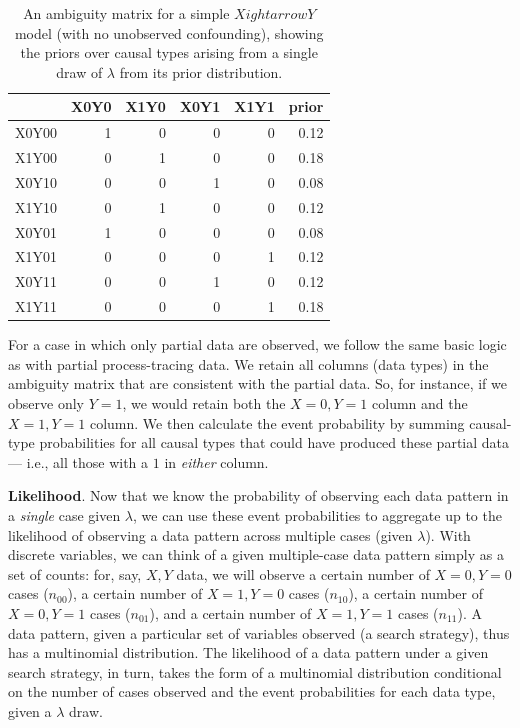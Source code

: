 \documentclass[12pt,]{book}
\begin{document}
\begin{table}[t]

\caption{\label{tab:ambigmatrixmix}An ambiguity matrix for a simple $X 
ightarrow Y$ model (with no unobserved confounding), showing the priors over causal types arising from a single draw of $\lambda$ from its prior distribution.}
\centering
\begin{tabular}{l|r|r|r|r|r}
\hline
  & X0Y0 & X1Y0 & X0Y1 & X1Y1 & prior\\
\hline
X0Y00 & 1 & 0 & 0 & 0 & 0.12\\
\hline
X1Y00 & 0 & 1 & 0 & 0 & 0.18\\
\hline
X0Y10 & 0 & 0 & 1 & 0 & 0.08\\
\hline
X1Y10 & 0 & 1 & 0 & 0 & 0.12\\
\hline
X0Y01 & 1 & 0 & 0 & 0 & 0.08\\
\hline
X1Y01 & 0 & 0 & 0 & 1 & 0.12\\
\hline
X0Y11 & 0 & 0 & 1 & 0 & 0.12\\
\hline
X1Y11 & 0 & 0 & 0 & 1 & 0.18\\
\hline
\end{tabular}
\end{table}

For a case in which only partial data are observed, we follow the same basic logic as with partial process-tracing data. We retain all columns (data types) in the ambiguity matrix that are consistent with the partial data. So, for instance, if we observe only \(Y=1\), we would retain both the \(X=0, Y=1\) column and the \(X=1, Y=1\) column. We then calculate the event probability by summing causal-type probabilities for all causal types that could have produced these partial data --- i.e., all those with a \(1\) in \emph{either} column.

\textbf{Likelihood}. Now that we know the probability of observing each data pattern in a \emph{single} case given \(\lambda\), we can use these event probabilities to aggregate up to the likelihood of observing a data pattern across multiple cases (given \(\lambda\)). With discrete variables, we can think of a given multiple-case data pattern simply as a set of counts: for, say, \(X, Y\) data, we will observe a certain number of \(X=0, Y=0\) cases (\(n_{00}\)), a certain number of \(X=1, Y=0\) cases (\(n_{10}\)), a certain number of \(X=0, Y=1\) cases (\(n_{01}\)), and a certain number of \(X=1, Y=1\) cases (\(n_{11}\)). A data pattern, given a particular set of variables observed (a search strategy), thus has a multinomial distribution. The likelihood of a data pattern under a given search strategy, in turn, takes the form of a multinomial distribution conditional on the number of cases observed and the event probabilities for each data type, given a \(\lambda\) draw.
\end{document}
